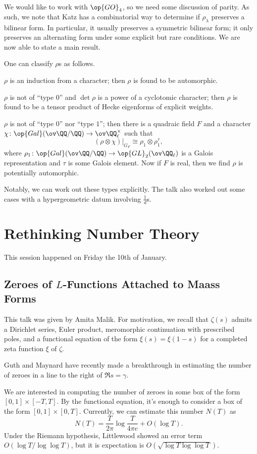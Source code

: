 \documentclass{article}
\begin{document}
We would like to work with $\op{GO}_4$, so we need some discussion of parity. As such, we note that Katz has a combinatorial way to determine if $\rho_\lambda$ preserves a bilinear form. In particular, it usually preserves a symmetric bilinear form; it only preserves an alternating form under some explicit but rare conditions. We are now able to state a main result.
\begin{theorem}
	One can classify $\rho$s as follows.
	\begin{listroman}
		\item $\rho$ is an induction from a character; then $\rho$ is found to be automorphic.
		\item $\rho$ is not of ``type $0$'' and $\det\rho$ is a power of a cyclotomic character; then $\rho$ is found to be a tensor product of Hecke eigenforms of explicit weights.
		\item $\rho$ is not of ``type $0$'' nor ``type $1$''; then there is a quadraic field $F$ and a character $\chi\colon\op{Gal}(\ov\QQ/\QQ)\to\ov\QQ_\ell^\times$ such that
		\[(\rho\otimes\chi)|_{G_F}\cong\rho_1\otimes\rho_1^\tau,\]
		where $\rho_1\colon\op{Gal}(\ov\QQ/\QQ)\to\op{GL}_2(\ov\QQ_\ell)$ is a Galois representation and $\tau$ is some Galois element. Now if $F$ is real, then we find $\rho$ is potentially automorphic.
	\end{listroman}
\end{theorem}
Notably, we can work out these types explicitly. The talk also worked out some cases with a hypergeometric datum involving $\frac1d$s.

\section{Rethinking Number Theory}
This session happened on Friday the 10th of January.

\subsection{Zeroes of \texorpdfstring{$L$}{ L}-Functions Attached to Maass Forms}
This talk was given by Amita Malik. For motivation, we recall that $\zeta(s)$ admits a Dirichlet series, Euler product, meromorphic continuation with prescribed poles, and a functional equation of the form $\xi(s)=\xi(1-s)$ for a completed zeta function $\xi$ of $\zeta$.
\begin{remark}
	Guth and Maynard have recently made a breakthrough in estimating the number of zeroes in a line to the right of $\Re s=\gamma$.
\end{remark}
We are interested in computing the number of zeroes in some box of the form $[0,1]\times[-T,T]$. By the functional equation, it's enough to consider a box of the form $[0,1]\times[0,T]$. Currently, we can estimate this number $N(T)$ as
\[N(T)=\frac T{2\pi}\log\frac T{4\pi e}+O(\log T).\]
Under the Riemann hypothesis, Littlewood showed an error term $O(\log T/\log\log T)$, but it is expectation is $O(\sqrt{\log T\log\log T})$.
\end{document}
